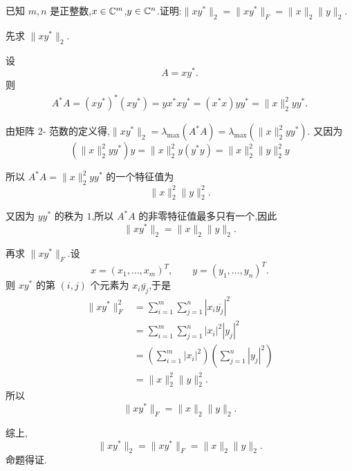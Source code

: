 \begin{problem}
已知 $m,n$ 是正整数,$x\in\mathbb{C}^m$,$y\in\mathbb{C}^n$.证明:$\|xy^*\|_2=\|xy^*\|_F=\|x\|_2\|y\|_2$.
\begin{solution}
    先求 $\|xy^*\|_2$.

    设
    \[
        A=xy^*.
    \]
    则
    \begin{align*}
        A^*A
        =(xy^*)^*(xy^*)
        =yx^*xy^*
        =(x^*x)yy^*
        =\|x\|_2^2yy^*.
    \end{align*}

    由矩阵 2- 范数的定义得,$\|xy^*\|_2 = \lambda_{\max}(A^*A) = \lambda_{\max}(\|x\|_2^2yy^*)$.
    又因为 
    \[
        (\|x\|_2^2 yy^*)y = \|x\|_2^2y(y^*y) = \|x\|_2^2\|y\|_2^2y
    \]
    
    所以 $A^*A=\|x\|_2^2yy^*$ 的一个特征值为
    \[
        \|x\|_2^2\|y\|_2^2.
    \]

    又因为 $yy^*$ 的秩为 $1$,所以 $A^*A$ 的非零特征值最多只有一个,因此
    \[
        \|xy^*\|_2 = \|x\|_2\|y\|_2.
    \]

    再求 $\|xy^*\|_F$.设
    \[
        x=(x_1,\dots,x_m)^T,\qquad y=(y_1,\dots,y_n)^T.
    \]
    则 $xy^*$ 的第 $(i,j)$ 个元素为 $x_i\overline{y_j}$,于是
    \begin{align*}
        \|xy^*\|_F^2
        &=\sum_{i=1}^{m}\sum_{j=1}^{n}|x_i\overline{y_j}|^2 \\
        &=\sum_{i=1}^{m}\sum_{j=1}^{n}|x_i|^2|y_j|^2 \\
        &=\left(\sum_{i=1}^{m}|x_i|^2\right)\left(\sum_{j=1}^{n}|y_j|^2\right) \\
        &=\|x\|_2^2\|y\|_2^2.
    \end{align*}
    所以
    \[
        \|xy^*\|_F=\|x\|_2\|y\|_2.
    \]

    综上,
    \[
        \|xy^*\|_2=\|xy^*\|_F=\|x\|_2\|y\|_2.
    \]
    命题得证.
\end{solution}
\end{problem}

